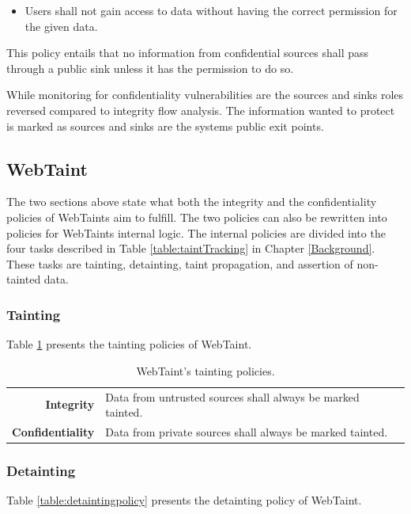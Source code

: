 \hfill
\begin{itemize}
    \item Users shall not gain access to data without having the correct permission for the given data.
\end{itemize}
\hfill

This policy entails that no information from confidential sources shall pass through a public sink unless it has the permission to do so.

While monitoring for confidentiality vulnerabilities are the sources and sinks roles reversed compared to integrity flow analysis. The information wanted to protect is marked as sources and sinks are the systems public exit points.



\subsection{WebTaint}
The two sections above state what both the integrity and the confidentiality policies of WebTaints aim to fulfill. The two policies can also be rewritten into policies for WebTaints internal logic. The internal policies are divided into the four tasks described in Table \ref{table:taintTracking} in Chapter \ref{Background}. These tasks are tainting, detainting, taint propagation, and assertion of non-tainted data.



\subsubsection{Tainting}
Table \ref{table:taintingpolicy} presents the tainting policies of WebTaint.

\begin{table}[H]
    \centering
    \caption{WebTaint's tainting policies.}
    \label{table:taintingpolicy}
    \begin{tabular}{rp{8.5cm}}
        \textbf{Integrity} & Data from untrusted sources shall always be marked tainted. \\
        \textbf{Confidentiality} & Data from private sources shall always be marked tainted. \\         
    \end{tabular}
\end{table}



\subsubsection{Detainting}
Table \ref{table:detaintingpolicy} presents the detainting policy of WebTaint.

